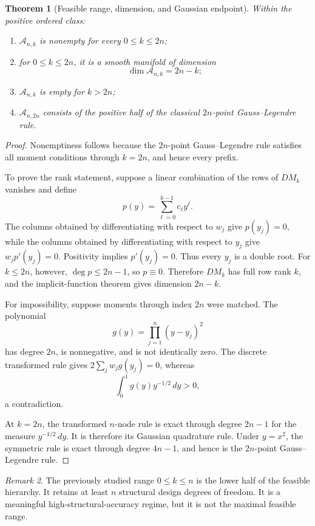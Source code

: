 \documentclass[preprint,12pt]{elsarticle}
\newtheorem{theorem}{Theorem}
\theoremstyle{remark}
\newtheorem{remark}[theorem]{Remark}
\begin{document}
\begin{theorem}[Feasible range, dimension, and Gaussian endpoint]
Within the positive ordered class:
\begin{enumerate}[label=(\roman*)]
\item \(\mathcal A_{n,k}\) is nonempty for every \(0\leq k\leq2n\);
\item for \(0\leq k\leq2n\), it is a smooth manifold of dimension
\[
\dim\mathcal A_{n,k}=2n-k;
\]
\item \(\mathcal A_{n,k}\) is empty for \(k>2n\);
\item \(\mathcal A_{n,2n}\) consists of the positive half of the
classical \(2n\)-point Gauss--Legendre rule.
\end{enumerate}
\end{theorem}

\begin{proof}
Nonemptiness follows because the \(2n\)-point Gauss--Legendre rule
satisfies all moment conditions through \(k=2n\), and hence every
prefix.

To prove the rank statement, suppose a linear combination of the rows
of \(DM_k\) vanishes and define
\[
p(y)=\sum_{\ell=0}^{k-1}c_\ell y^\ell.
\]
The columns obtained by differentiating with respect to \(w_j\) give
\(p(y_j)=0\), while the columns obtained by differentiating with respect
to \(y_j\) give \(w_jp'(y_j)=0\). Positivity implies
\(p'(y_j)=0\). Thus every \(y_j\) is a double root. For
\(k\leq2n\), however, \(\deg p\leq2n-1\), so \(p\equiv0\).
Therefore \(DM_k\) has full row rank \(k\), and the implicit-function
theorem gives dimension \(2n-k\).

For impossibility, suppose moments through index \(2n\) were matched.
The polynomial
\[
g(y)=\prod_{j=1}^{n}(y-y_j)^2
\]
has degree \(2n\), is nonnegative, and is not identically zero. The
discrete transformed rule gives \(2\sum_jw_jg(y_j)=0\), whereas
\[
\int_0^1g(y)y^{-1/2}\,dy>0,
\]
a contradiction.

At \(k=2n\), the transformed \(n\)-node rule is exact through degree
\(2n-1\) for the measure \(y^{-1/2}\,dy\). It is therefore its Gaussian
quadrature rule. Under \(y=x^2\), the symmetric rule is exact through
degree \(4n-1\), and hence is the \(2n\)-point Gauss--Legendre rule.
\end{proof}

\begin{remark}
The previously studied range \(0\leq k\leq n\) is the lower half of the
feasible hierarchy. It retains at least \(n\) structural design degrees
of freedom. It is a meaningful high-structural-accuracy regime, but it
is not the maximal feasible range.
\end{remark}
\end{document}

